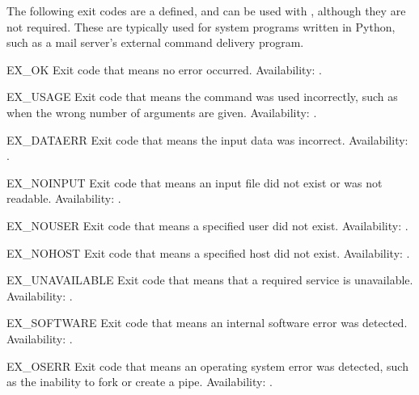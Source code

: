 The following exit codes are a defined, and can be used with
, although they are not required.  These are
typically used for system programs written in Python, such as a
mail server's external command delivery program.

\begin{datadesc}{EX_OK}
Exit code that means no error occurred.
Availability: \UNIX.
\end{datadesc}

\begin{datadesc}{EX_USAGE}
Exit code that means the command was used incorrectly, such as when
the wrong number of arguments are given.
Availability: \UNIX.
\end{datadesc}

\begin{datadesc}{EX_DATAERR}
Exit code that means the input data was incorrect.
Availability: \UNIX.
\end{datadesc}

\begin{datadesc}{EX_NOINPUT}
Exit code that means an input file did not exist or was not readable.
Availability: \UNIX.
\end{datadesc}

\begin{datadesc}{EX_NOUSER}
Exit code that means a specified user did not exist.
Availability: \UNIX.
\end{datadesc}

\begin{datadesc}{EX_NOHOST}
Exit code that means a specified host did not exist.
Availability: \UNIX.
\end{datadesc}

\begin{datadesc}{EX_UNAVAILABLE}
Exit code that means that a required service is unavailable.
Availability: \UNIX.
\end{datadesc}

\begin{datadesc}{EX_SOFTWARE}
Exit code that means an internal software error was detected.
Availability: \UNIX.
\end{datadesc}

\begin{datadesc}{EX_OSERR}
Exit code that means an operating system error was detected, such as
the inability to fork or create a pipe.
Availability: \UNIX.
\end{datadesc}

